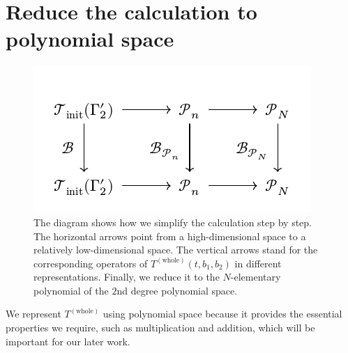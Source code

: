\documentclass{article}
\newcommand{\Twhole}{T^{(\text{whole})}}
\begin{document}
\section{Reduce the calculation to polynomial space}
\begin{figure}
    \centering
    \includegraphics[width=0.8\linewidth]{figures/appendix/commute_diagram.pdf}
    \caption{The diagram shows how we simplify the calculation step by step. The horizontal arrows point from a high-dimensional space to a relatively low-dimensional space. The vertical arrows stand for the corresponding operators of $\Twhole(t,b_1, b_2)$ in different representations. Finally, we reduce it to the $N$-elementary polynomial of the $2$nd degree polynomial space.}
    \label{diagram: commute diagram}
\end{figure}

We represent $\Twhole$ using polynomial space because it provides the essential properties we require, such as multiplication and addition, which will be important for our later work. 
\end{document}
